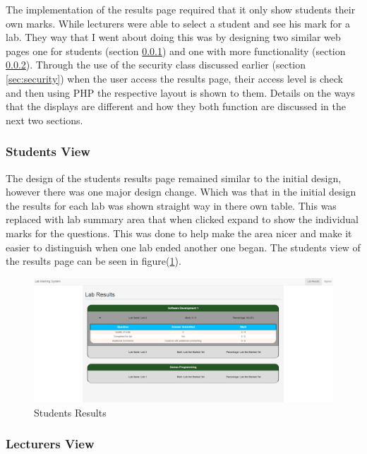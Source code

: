 \documentclass[12pt]{article}  %
\begin{document}
The implementation of the results page required that it only show students their own marks. While lecturers were able to select a student and see his mark for a lab. They way that I went about doing this was by designing two similar web pages one for students (section \ref{sec:results-student}) and one with more functionality (section \ref{sec:results-lecturer}). Through the use of the security class discussed earlier (section \ref{sec:security}) when the user access the results page, their access level is check and then using PHP the respective layout is shown to them. Details on the ways that the displays are different and how they both function are discussed in the next two sections.



\subsubsection{Students View} \label{sec:results-student}

The design of the students results page remained similar to the initial design, however there was one major design change. Which was that in the initial design the results for each lab was shown straight way in there own table. This was replaced with lab summary area that when clicked expand to show the individual marks for the questions. This was done to help make the area nicer and make it easier to distinguish when one lab ended another one began. The students view of the results page can be seen in figure(\ref{fig:results-student}).


\begin{figure}[H]
    \centering
    \includegraphics[width=1\textwidth]{images/implementation/student-results-page.png}
    \caption{Students Results}
    \label{fig:results-student}
\end{figure}

\subsubsection{Lecturers View} \label{sec:results-lecturer}
\end{document}
